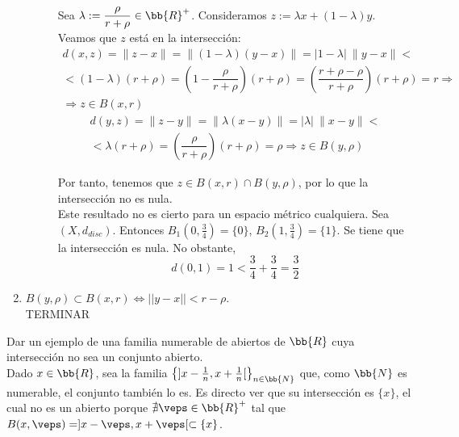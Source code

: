 \begin{ejercicio}
\begin{enumerate}
\begin{description}
\begin{comment}
            Por tanto, tenemos que $\exists z\in X$ tal que $d(x,y)\leq d(x,z)+d(y,z)< r+\rho$. Entonces:
            \begin{gather*}
                d(x,z)+d(y,z)< r+\rho 
            \end{gather*}
            \end{comment}

            Sea $\lambda:=\dfrac{\rho}{r+\rho}\in \bb{R}^+$. Consideramos $z:= \lambda x+(1-\lambda)y$. Veamos que $z$ está en la intersección:
            \begin{multline*}
                d(x,z)=\|z-x\|=\|(1-\lambda)(y-x)\| =|1-\lambda|~\|y-x\| <\\
                < (1-\lambda)(r+\rho) = \left(1-\dfrac{\rho}{r+\rho}\right)(r+\rho)
                = \left(\dfrac{r+\rho-\rho}{r+\rho}\right)(r+\rho)= r \Longrightarrow\\\Longrightarrow z\in B(x,r)
            \end{multline*}
            \begin{multline*}
                d(y,z)=\|z-y\|=\|\lambda(x-y)\| =|\lambda|~\|x-y\| <\\
                < \lambda(r+\rho) = \left(\dfrac{\rho}{r+\rho}\right)(r+\rho)
                = \rho \Longrightarrow z\in B(y,\rho)
            \end{multline*}

            Por tanto, tenemos que $z\in B(x,r)\cap B(y,\rho)$, por lo que la intersección no es nula.\\

            Este resultado no es cierto para un espacio métrico cualquiera. Sea $(X,d_{disc})$. Entonces $B_1\left(0,\frac{3}{4}\right)=\{0\}$, $B_2\left(1, \frac{3}{4}\right)=\{1\}$. Se tiene que la intersección es nula. No obstante, $$d(0, 1)=1<\frac{3}{4} + \frac{3}{4}=\frac{3}{2}$$
        \end{description}

        

        
        \item $B(y,\rho)\subset B(x,r) \Longleftrightarrow ||y-x|| <r-\rho$. \label{Ej:Tema2_2.2}\\

        TERMINAR
    \end{enumerate}
\end{ejercicio}


\begin{ejercicio}
    Dar un ejemplo de una familia numerable de abiertos de $\bb{R}$ cuya intersección no sea un conjunto abierto.\\

    Dado $x\in \bb{R}$, sea la familia $\left\{]x-\frac{1}{n}, x+\frac{1}{n}[\right\}_{n\in \bb{N}}$ que, como $\bb{N}$ es numerable, el conjunto también lo es. Es directo ver que su intersección es $\{x\}$, el cual no es un abierto porque $\nexists \veps\in \bb{R}^+$ tal que $B(x,\veps)=]x-\veps, x+\veps[\subset \{x\}$.
\end{ejercicio}

